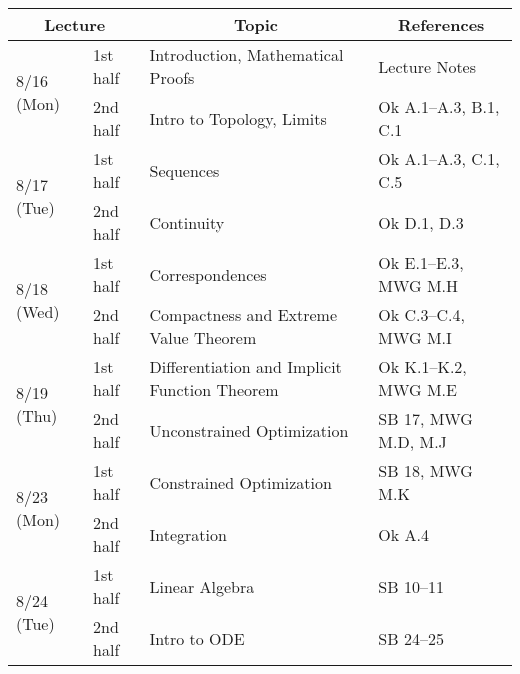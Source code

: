 \documentclass[11pt]{article}
\begin{document}
\begin{tabularx}{\columnwidth}{llll}
  \toprule
  \multicolumn{2}{c}{Lecture}
  &
  \multicolumn{1}{c}{Topic}
  &
  \multicolumn{1}{c}{References}
                                                                                                                 \\\midrule
  \multirow{2}{*}{8/16 (Mon)} & 1st half & Introduction, Mathematical Proofs             & Lecture Notes         \\
                              & 2nd half & Intro to Topology, Limits                     & Ok A.1--A.3, B.1, C.1 \\ [6pt]
  \multirow{2}{*}{8/17 (Tue)} & 1st half & Sequences                                     & Ok A.1--A.3, C.1, C.5 \\
                              & 2nd half & Continuity                                    & Ok D.1, D.3           \\ [6pt]
  \multirow{2}{*}{8/18 (Wed)} & 1st half & Correspondences                               & Ok E.1--E.3, MWG M.H  \\
                              & 2nd half & Compactness and Extreme Value Theorem         & Ok C.3--C.4, MWG M.I  \\ [6pt]
  \multirow{2}{*}{8/19 (Thu)} & 1st half & Differentiation and Implicit Function Theorem & Ok K.1--K.2, MWG M.E  \\
                              & 2nd half & Unconstrained Optimization                    & SB 17, MWG M.D, M.J   \\ [6pt]
  \multirow{2}{*}{8/23 (Mon)} & 1st half & Constrained Optimization                      & SB 18, MWG M.K        \\
                              & 2nd half & Integration                                   & Ok A.4                \\ [6pt]
  \multirow{2}{*}{8/24 (Tue)} & 1st half & Linear Algebra                                & SB 10--11             \\
                              & 2nd half & Intro to ODE                                  & SB 24--25             \\
  \bottomrule
\end{tabularx}


\end{document}
